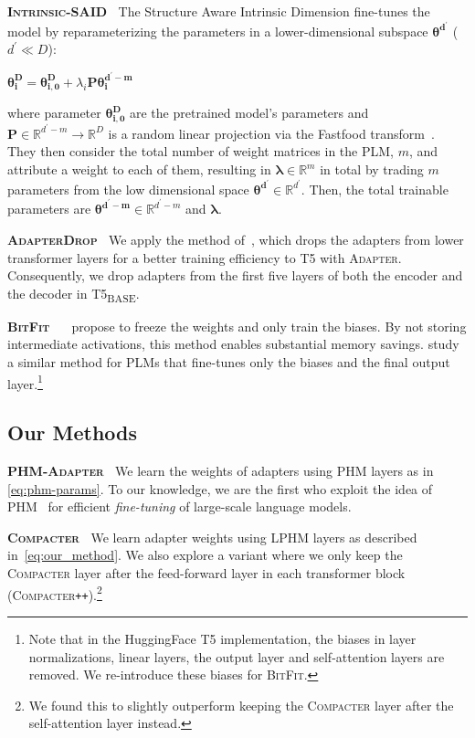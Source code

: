 \textbf{\textsc{Intrinsic-SAID}} $\:$ The Structure Aware Intrinsic Dimension \citep{aghajanyan2020intrinsic} fine-tunes the model by reparameterizing the parameters in a lower-dimensional subspace $\bm{\theta^{d^{\prime}}}$ ($d^{\prime} \ll D$): 

$\bm{\theta_i^D} = \bm{\theta^D_{i,0}} + \lambda_i \bm{P} \bm{\theta^{d^{\prime}-m}_i}$

where parameter $\bm{\theta^D_{i,0}}$ are the pretrained model's parameters and $\bm{P} \in \mathbb{R}^{d^\prime-m}\to \mathbb{R}^D$ is a random linear projection via the Fastfood transform~\citep{le2013fastfood}. They then consider the total number of weight matrices in the PLM, $m$, and attribute a weight to each of them, resulting in $\bm{\lambda} \in\mathbb{R}^m$ in total by trading $m$ parameters from the low dimensional space $\bm{\theta^{d^{\prime}}} \in \mathbb{R}^{d^{\prime}}$. Then, the total trainable parameters are $\bm{\theta^{d^{\prime}-m}} \in \mathbb{R}^{d^{\prime} - m} $ and $\bm{\lambda}$.

\textbf{\textsc{AdapterDrop}} $\:$ We apply the method of~\citet{Ruckle2020adapterdrop}, which drops the adapters from lower transformer layers for a better training efficiency to T5 with \textsc{Adapter}. Consequently, we drop adapters from the first five layers of both the encoder and the decoder in T5\textsubscript{\tiny BASE}.

\textbf{\textsc{BitFit}} $\:$ ~\citet{cai2020tinytl} propose to freeze the weights and only train the biases. By not storing intermediate activations, this method enables substantial memory savings. \citet{ravfogel2021bitfit} study a similar method for PLMs that fine-tunes only the biases and the final output layer.\footnote{Note that in the HuggingFace T5 implementation, the biases in layer normalizations, linear layers, the output layer and self-attention layers are removed. We re-introduce these biases for \textsc{BitFit}.} 

\subsection{Our Methods}

\textbf{\textsc{PHM-Adapter}} $\:$ We learn the weights of adapters using PHM layers as in \eqref{eq:phm-params}. To our knowledge, we are the first who exploit the idea of PHM~\citep{zhang2021beyond} for efficient \emph{fine-tuning} of large-scale language models. 

\textbf{\textsc{Compacter}} $\:$ We learn adapter weights using LPHM layers as described in~\eqref{eq:our_method}. We also explore a variant where we only keep the \textsc{Compacter} layer after the feed-forward layer in each transformer block (\textsc{Compacter}\texttt{++}).\footnote{We found this to slightly outperform keeping the \textsc{Compacter} layer after the self-attention layer instead.}

